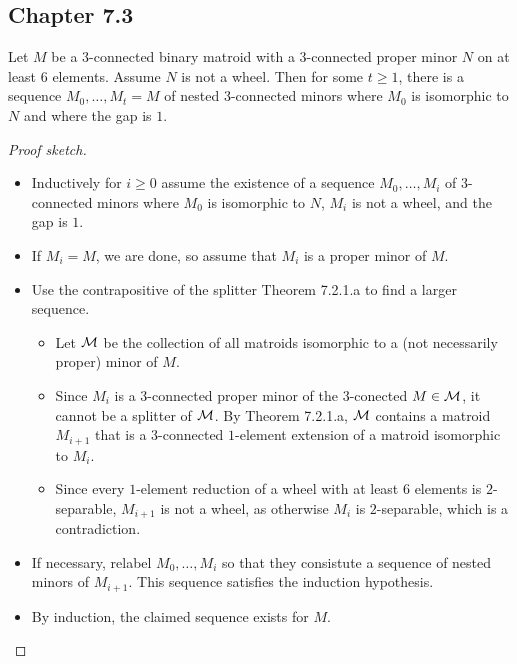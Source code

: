 \subsection{Chapter 7.3}

\begin{theorem}[7.3.1.a]
  \label{thm:7.3.1.a}
  Let $M$ be a $3$-connected binary matroid with a $3$-connected proper minor $N$ on at least $6$ elements. Assume $N$ is not a wheel.
  Then for some $t \geq 1$, there is a sequence $M_{0}, \dots, M_{t} = M$ of nested $3$-connected minors where $M_{0}$ is isomorphic to $N$ and where the gap is $1$.
\end{theorem}

\begin{proof}[Proof sketch]
  \begin{itemize}
    \item Inductively for $i \geq 0$ assume the existence of a sequence $M_{0}, \dots, M_{i}$ of $3$-connected minors where $M_{0}$ is isomorphic to $N$, $M_{i}$ is not a wheel, and the gap is $1$.
    \item If $M_{i} = M$, we are done, so assume that $M_{i}$ is a proper minor of $M$.
    \item Use the contrapositive of the splitter Theorem 7.2.1.a to find a larger sequence.
    \begin{itemize}
      \item Let $\mathcal{M}$ be the collection of all matroids isomorphic to a (not necessarily proper) minor of $M$.
      \item Since $M_{i}$ is a $3$-connected proper minor of the $3$-conected $M \in \mathcal{M}$, it cannot be a splitter of $\mathcal{M}$. By Theorem 7.2.1.a, $\mathcal{M}$ contains a matroid $M_{i + 1}$ that is a $3$-connected $1$-element extension of a matroid isomorphic to $M_{i}$.
      \item Since every $1$-element reduction of a wheel with at least $6$ elements is $2$-separable, $M_{i + 1}$ is not a wheel, as otherwise $M_{i}$ is $2$-separable, which is a contradiction.
    \end{itemize}
    \item If necessary, relabel $M_{0}, \dots, M_{i}$ so that they consistute a sequence of nested minors of $M_{i + 1}$. This sequence satisfies the induction hypothesis.
    \item By induction, the claimed sequence exists for $M$.
  \end{itemize}
\end{proof}

